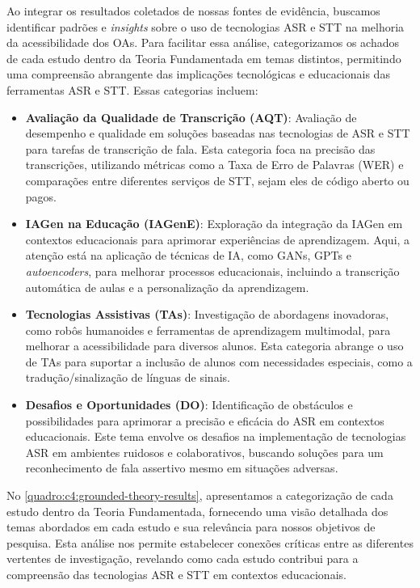 Ao integrar os resultados coletados de nossas fontes de evidência, buscamos identificar padrões e \textit{insights} sobre o uso de tecnologias ASR e STT na melhoria da acessibilidade dos OAs. Para facilitar essa análise, categorizamos os achados de cada estudo dentro da Teoria Fundamentada em temas distintos, permitindo uma compreensão abrangente das implicações tecnológicas e educacionais das ferramentas ASR e STT. Essas categorias incluem:

\begin{itemize}
\item \textbf{Avaliação da Qualidade de Transcrição (AQT)}: Avaliação de desempenho e qualidade em soluções baseadas nas tecnologias de ASR e STT para tarefas de transcrição de fala. Esta categoria foca na precisão das transcrições, utilizando métricas como a Taxa de Erro de Palavras (WER) e comparações entre diferentes serviços de STT, sejam eles de código aberto ou pagos.

\item \textbf{IAGen na Educação (IAGenE)}: Exploração da integração da IAGen em contextos educacionais para aprimorar experiências de aprendizagem. Aqui, a atenção está na aplicação de técnicas de IA, como GANs, GPTs e \textit{autoencoders}, para melhorar processos educacionais, incluindo a transcrição automática de aulas e a personalização da aprendizagem.

\item \textbf{Tecnologias Assistivas (TAs)}: Investigação de abordagens inovadoras, como robôs humanoides e ferramentas de aprendizagem multimodal, para melhorar a acessibilidade para diversos alunos. Esta categoria abrange o uso de TAs para suportar a inclusão de alunos com necessidades especiais, como a tradução/sinalização de línguas de sinais.

\item \textbf{Desafios e Oportunidades (DO)}: Identificação de obstáculos e possibilidades para aprimorar a precisão e eficácia do ASR em contextos educacionais. Este tema envolve os desafios na implementação de tecnologias ASR em ambientes ruidosos e colaborativos, buscando soluções para um reconhecimento de fala assertivo mesmo em situações adversas.
\end{itemize}

No \autoref{quadro:c4:grounded-theory-results}, apresentamos a categorização de cada estudo dentro da Teoria Fundamentada, fornecendo uma visão detalhada dos temas abordados em cada estudo e sua relevância para nossos objetivos de pesquisa. Esta análise nos permite estabelecer conexões críticas entre as diferentes vertentes de investigação, revelando como cada estudo contribui para a compreensão das tecnologias ASR e STT em contextos educacionais.

